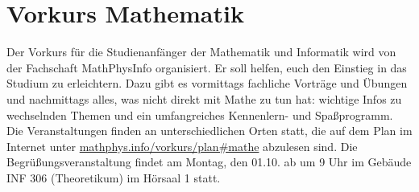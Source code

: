 \section{Vorkurs Mathematik}
Der Vorkurs für die Studienanfänger der Mathematik und Informatik wird von der Fachschaft MathPhysInfo organisiert. Er soll helfen, euch den Einstieg in das Studium zu erleichtern. Dazu gibt es vormittags fachliche Vorträge und Übungen und nachmittags alles, was nicht direkt mit Mathe zu tun hat: wichtige Infos zu wechselnden Themen und ein umfangreiches Kennenlern- und Spaßprogramm.
Die Veranstaltungen finden an unterschiedlichen Orten statt, die auf dem Plan im Internet  unter \url{mathphys.info/vorkurs/plan\#mathe} abzulesen sind. Die Begrüßungsveranstaltung findet am Montag, den 01.10. ab um 9 Uhr im Gebäude \gls{INF} 306 (Theoretikum) im Hörsaal 1 statt.
